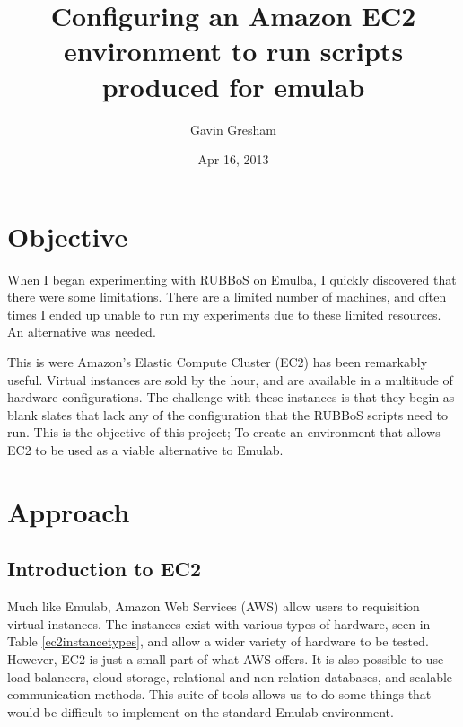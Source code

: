 \documentclass{article}
\begin{document}
\title{Configuring an Amazon EC2 environment to run scripts produced for emulab}
\author{Gavin Gresham}
\date{Apr 16, 2013}
\maketitle

\tableofcontents
\pagebreak

\section{Objective}
When I began experimenting with RUBBoS on Emulba, I quickly discovered that there were some limitations. There are a limited number of machines, and often times I ended up unable to run my experiments due to these limited resources. An alternative was needed.

This is were Amazon's Elastic Compute Cluster (EC2) has been remarkably useful. Virtual instances are sold by the hour, and are available in a multitude of hardware configurations. The challenge with these instances is that they begin as blank slates that lack any of the configuration that the RUBBoS scripts need to run. This is the objective of this project; To create an environment that allows EC2 to be used as a viable alternative to Emulab.
\section{Approach}
\subsection{Introduction to EC2}
Much like Emulab, Amazon Web Services (AWS) allow users to requisition virtual instances. The instances exist with various types of hardware, seen in Table \ref{ec2instancetypes}, and allow a wider variety of hardware to be tested. However, EC2 is just a small part of what AWS offers. It is also possible to use load balancers, cloud storage, relational and non-relation databases, and scalable communication methods. This suite of tools allows us to do some things that would be difficult to implement on the standard Emulab environment.
\end{document}
